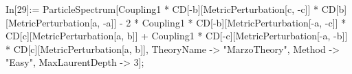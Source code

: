 In[29]:= ParticleSpectrum[Coupling1 * CD[-b][MetricPerturbation[c, -c]] * CD[b][MetricPerturbation[a, -a]] - 2 * Coupling1 * CD[-b][MetricPerturbation[-a, -c]] * CD[c][MetricPerturbation[a, b]] + Coupling1 * CD[-c][MetricPerturbation[-a, -b]] * CD[c][MetricPerturbation[a, b]], TheoryName -> "MarzoTheory", Method -> "Easy", MaxLaurentDepth -> 3]; 